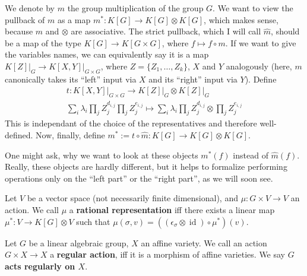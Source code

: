 \begin{definition}
We denote by $m$ the group multiplication of the group $G$.
We want to view the pullback of $m$ as a map $m^\ast : K[G] \longrightarrow K[G] \otimes K[G]$, which makes sense, because $m$ and $\otimes$ are associative.
The strict pullback, which I will call $ \hat{m} $, should be a map of the type $ K[G] \longrightarrow K[ G \times G] $, where $ f \mapsto f \circ m $.
If we want to give the variables names, we can equivalently say it is a map $ \left. K[Z] \right|_G \longrightarrow \left. K[X,Y] \right|_{G \times G} $, where $ Z = \lbrace Z_1 , \ldots , Z_k \rbrace $, $X$ and $Y$ analogously (here, $ m $ canonically takes its ``left'' input via $ X $ and its ``right'' input via $ Y $). Define
\begin{equation}
  \begin{aligned}
   t : \left. K \left\lbrack X , Y \right\rbrack \right|_{G \times G} \longrightarrow \left. K \left\lbrack Z \right\rbrack \right|_G \otimes \left. K\left\lbrack Z \right\rbrack \right|_G \\
    \sum_i \lambda_i \prod_j Z_{j}^{d_{i,j}} \prod_j Z_{j}^{e_{i,j}} \mapsto \sum_i \lambda_i \prod_j Z_{j}^{d_{i,j}} \otimes \prod_j Z_{j}^{e_{i,j}} 
  \end{aligned}
\end{equation}
This is independant of the choice of the representatives and therefore well-defined.
Now, finally, define $m^\ast := t \circ \hat{m} : K[G] \longrightarrow K[G] \otimes K[G]$.
\end{definition}


One might ask, why we want to look at these objects $ m^\ast \left( f \right) $ instead of $ \hat{m} \left( f \right) $.
Really, these objects are hardly different, but it helps to formalize performing operations only on the ``left part'' or the ``right part'', as we will soon see.

\smallskip
\begin{definition}
  Let $V$ be a vector space (not necessarily finite dimensional), and $ \mu : G \times V \longrightarrow V $ an action.
  We call $ \mu $ a \textbf{rational representation} iff there exists a linear map $ \mu^\ast : V \longrightarrow K[G] \otimes V $ such that $ \mu \left( \sigma , v \right) = \left( \left( \epsilon_\sigma \otimes \operatorname{id} \right) \circ \mu^\ast \right) \left(v\right) $. 
\end{definition}

\begin{definition}
  Let $G$ be a linear algebraic group, $X$ an affine variety.
  We call an action $G \times X \longrightarrow X$ a \textbf{regular action}, iff it is a morphism of affine varieties.
  We say \textbf{$ G $ acts regularly on $ X $}.
\end{definition}

